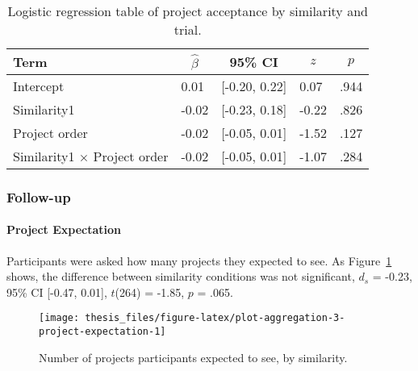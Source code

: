 \documentclass[a4paper, nobind]{templates/ociamthesis}
\theoremstyle{definition}
\theoremstyle{definition}
\theoremstyle{definition}
\theoremstyle{definition}
\theoremstyle{remark}
\begin{document}
\begin{table}[tbp]

\begin{center}
\begin{threeparttable}

\caption{\label{tab:similarity-project-order}Logistic regression table of project acceptance by similarity and trial.}

\begin{tabular}{lllll}
\toprule
Term & \multicolumn{1}{c}{$\hat{\beta}$} & \multicolumn{1}{c}{95\% CI} & \multicolumn{1}{c}{$z$} & \multicolumn{1}{c}{$p$}\\
\midrule
Intercept & 0.01 & {}[-0.20, 0.22] & 0.07 & .944\\
Similarity1 & -0.02 & {}[-0.23, 0.18] & -0.22 & .826\\
Project order & -0.02 & {}[-0.05, 0.01] & -1.52 & .127\\
Similarity1 $\times$ Project order & -0.02 & {}[-0.05, 0.01] & -1.07 & .284\\
\bottomrule
\end{tabular}

\end{threeparttable}
\end{center}

\end{table}

\subsubsection{Follow-up}

\paragraph{Project Expectation}

Participants were asked how many projects they expected to see. As
Figure~\ref{fig:plot-aggregation-3-project-expectation} shows, the difference
between similarity conditions was not significant,
\(d_s\) = -0.23, 95\% CI {[}-0.47, 0.01{]}, \(t\)(264) = -1.85, \(p\) = .065.



\begin{figure}
\texttt{[image: thesis\_files/figure-latex/plot-aggregation-3-project-expectation-1]} \caption{Number of projects participants expected to see, by similarity.}\label{fig:plot-aggregation-3-project-expectation}
\end{figure}
\end{document}
